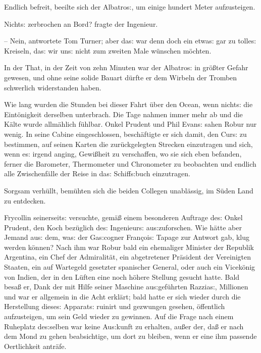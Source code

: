 \documentclass[oneside,12pt]{book}
\newcommand{\s}{s:}
\begin{document}
Endlich befreit, beeilte sich der {\glqq}Albatro{\s}{\grqq}, um
einige hundert Meter aufzusteigen.

{\glqq}Nicht{\s} zerbrochen an Bord?{\grqq} fragte der Ingenieur.

-- Nein, antwortete Tom Turner; aber da{\s} war denn doch ein
etwa{\s} gar zu tolle{\s} Kreiseln, da{\s} wir un{\s} nicht zum
zweiten Male w\"unschen m\"ochten.{\grqq}

In der That, in der Zeit von zehn Minuten war der
{\glqq}Albatro{\s}{\grqq} in gr\"o{\ss}ter Gefahr gewesen, und ohne
seine solide Bauart d\"urfte er dem Wirbeln der Tromben schwerlich
widerstanden haben.

Wie lang wurden die Stunden bei dieser Fahrt \"uber den Ocean, wenn
nicht{\s} die Eint\"onigkeit derselben unterbrach. Die Tage nahmen
immer mehr ab und die K\"alte wurde allm\"ahlich f\"uhlbar. Onkel
Prudent und Phil Evan{\s} sahen Robur nur wenig. In seine Cabine
eingeschlossen, besch\"aftigte er sich damit, den Cur{\s} zu
bestimmen, auf seinen Karten die zur\"uckgelegten Strecken
einzutragen und sich, wenn e{\s} irgend anging, Gewi{\ss}heit zu
verschaffen, wo sie sich eben befanden, ferner die Barometer,
Thermometer und Chronometer zu beobachten und endlich alle
Zwischenf\"alle der Reise in da{\s} Schiff{\s}buch einzutragen.

Sorgsam verh\"ullt, bem\"uhten sich die beiden Collegen unabl\"assig,
im S\"uden Land zu entdecken.

Frycollin seinerseit{\s} versuchte, gem\"a{\ss} einem besonderen
Auftrage de{\s} Onkel Prudent, den Koch bez\"uglich de{\s}
Ingenieur{\s} au{\s}zuforschen. Wie h\"atte aber Jemand au{\s} dem,
wa{\s} der Ga{\s}cogner Fran\c{c}oi{\s} Tapage zur Antwort gab, klug
werden k\"onnen? Nach ihm war Robur bald ein ehemaliger Minister der
Republik Argentina, ein Chef der Admiralit\"at, ein abgetretener
Pr\"asident der Vereinigten Staaten, ein auf Wartegeld gesetzter
spanischer General, oder auch ein Vicek\"onig von Indien, der in den
L\"uften eine noch h\"ohere Stellung gesucht hatte. Bald besa{\ss}
er, Dank der mit Hilfe seiner Maschine au{\s}gef\"uhrten Razzia{\s},
Millionen und war er allgemein in die Acht erkl\"art; bald hatte er
sich wieder durch die Herstellung diese{\s} Apparat{\s} ruinirt und
gezwungen gesehen, \"offentlich aufzusteigen, um sein Geld wieder zu
gewinnen. Auf die Frage nach einem Ruheplatz de{\s}selben war keine
Au{\s}kunft zu erhalten, au{\ss}er der, da{\ss} er nach dem Mond zu
gehen beabsichtige, um dort zu bleiben, wenn er eine ihm passende
Oertlichkeit antr\"afe.
\end{document}
